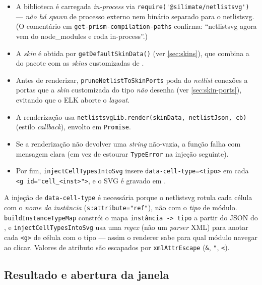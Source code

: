 \begin{itemize}[leftmargin=1.4em]
  \item A biblioteca é carregada \emph{in-process} via
        \lstinline|require('@silimate/netlistsvg')| --- \emph{não há} \emph{spawn}
        de processo externo nem binário separado para o netlistsvg. (O comentário
        em \lstinline|get-prism-compilation-paths| confirma: \enquote{netlistsvg
        agora vem do node\_modules e roda in-process}.)
  \item A \emph{skin} é obtida por \lstinline|getDefaultSkinData()| (ver
        \autoref{sec:skins}), que combina a  do pacote com
        as \emph{skins} customizadas de .
  \item Antes de renderizar, \lstinline|pruneNetlistToSkinPorts| poda do
        \emph{netlist} conexões a portas que a \emph{skin} customizada do tipo
        \emph{não} desenha (ver \autoref{sec:skin-ports}), evitando que o ELK
        aborte o \emph{layout}.
  \item A renderização usa \lstinline|netlistsvgLib.render(skinData, netlistJson, cb)|
        (estilo \emph{callback}), envolto em \lstinline|Promise|.
  \item Se a renderização não devolver uma \emph{string} não-vazia, a função
        falha com mensagem clara (em vez de estourar \lstinline|TypeError| na
        injeção seguinte).
  \item Por fim, \lstinline|injectCellTypesIntoSvg| insere
        \lstinline|data-cell-type=<tipo>| em cada \lstinline|<g id="cell_<inst>">|,
        e o SVG é gravado em .
\end{itemize}

A injeção de \lstinline|data-cell-type| é necessária porque o netlistsvg rotula
cada célula com o \emph{nome da instância} (\lstinline|s:attribute="ref"|), não
com o \emph{tipo} de módulo. \lstinline|buildInstanceTypeMap| constrói o mapa
\lstinline|instância -> tipo| a partir do JSON do , e
\lstinline|injectCellTypesIntoSvg| usa uma \emph{regex} (não um \emph{parser} XML)
para anotar cada \lstinline|<g>| de célula com o tipo --- assim o renderer sabe
para qual módulo navegar ao clicar. Valores de atributo são escapados por
\lstinline|xmlAttrEscape| (\lstinline|&|, \lstinline|"|, \lstinline|<|).

\subsection{Resultado e abertura da janela}

